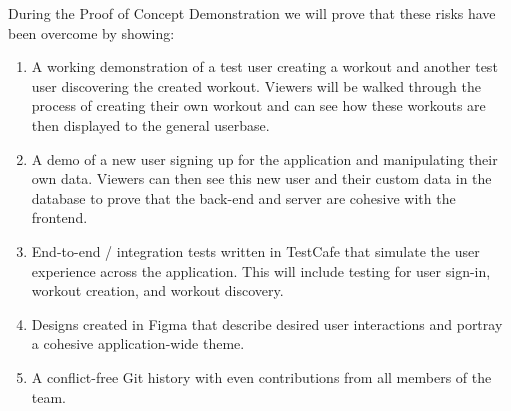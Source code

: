 \documentclass{article}
\begin{document}
	During the Proof of Concept Demonstration we will prove that these risks have been overcome by showing:
	\begin{enumerate}
		\item A working demonstration of a test user creating a workout and another test user discovering the created workout. Viewers will be walked through the process of
		creating their own workout and can see how these workouts are then displayed to the general userbase.
		\item A demo of a new user signing up for the application and manipulating their own data. Viewers can then see this new user and their custom data in the database
		to prove that the back-end and server are cohesive with the frontend.
		\item End-to-end / integration tests written in TestCafe that simulate the user experience across the application. This will include testing for user sign-in, workout creation, and workout discovery.
		\item Designs created in Figma that describe desired user interactions and portray a cohesive application-wide theme.
		\item A conflict-free Git history with even contributions from all members of the team.
	\end{enumerate}
	
	
\end{document}
